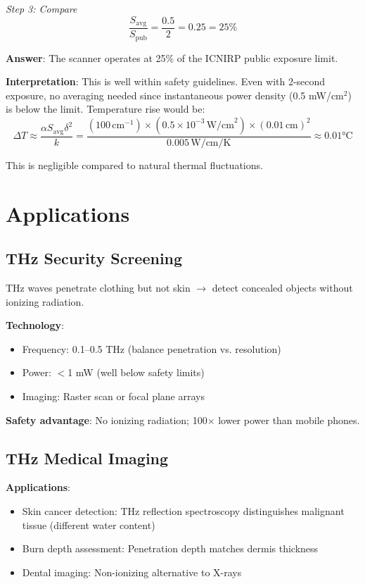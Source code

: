 \textit{Step 3: Compare}
\begin{equation}
\frac{S_{\text{avg}}}{S_{\text{pub}}} = \frac{0.5}{2} = 0.25 = 25\%
\end{equation}

\textbf{Answer}: The scanner operates at 25\% of the ICNIRP public exposure limit.

\textbf{Interpretation}: This is well within safety guidelines. Even with 2-second exposure, no averaging needed since instantaneous power density (0.5 mW/cm$^2$) is below the limit. Temperature rise would be:
\begin{equation}
\Delta T \approx \frac{\alpha S_{\text{avg}} \delta^2}{k} = \frac{(100\,\text{cm}^{-1}) \times (0.5 \times 10^{-3}\,\text{W/cm}^2) \times (0.01\,\text{cm})^2}{0.005\,\text{W/cm/K}} \approx 0.01°\text{C}
\end{equation}

This is negligible compared to natural thermal fluctuations.

\section{Applications}

\subsection{THz Security Screening}

THz waves penetrate clothing but not skin $\rightarrow$ detect concealed objects without ionizing radiation.

\textbf{Technology}:
\begin{itemize}
\item Frequency: 0.1--0.5 THz (balance penetration vs. resolution)
\item Power: $<$1 mW (well below safety limits)
\item Imaging: Raster scan or focal plane arrays
\end{itemize}

\textbf{Safety advantage}: No ionizing radiation; 100× lower power than mobile phones.

\subsection{THz Medical Imaging}

\textbf{Applications}:
\begin{itemize}
\item Skin cancer detection: THz reflection spectroscopy distinguishes malignant tissue (different water content)
\item Burn depth assessment: Penetration depth matches dermis thickness
\item Dental imaging: Non-ionizing alternative to X-rays
\end{itemize}

